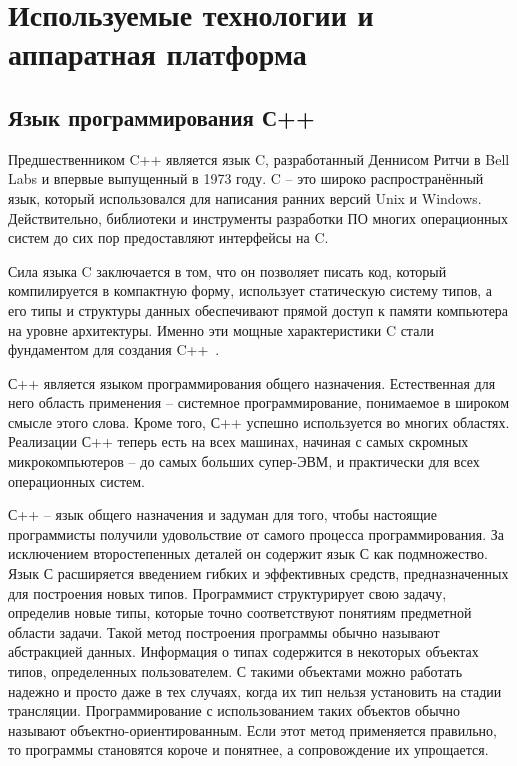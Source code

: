 \section{Используемые технологии и аппаратная платформа}


\subsection{Язык программирования С++}

Предшественником C++ является язык C, разработанный Деннисом Ритчи в Bell Labs и впервые выпущенный в 1973 году. C -- это широко распространённый язык, который использовался для написания ранних версий Unix и Windows. Действительно, библиотеки и инструменты разработки ПО многих операционных систем до сих пор предоставляют интерфейсы на C.

Сила языка C заключается в том, что он позволяет писать код, который компилируется в компактную форму, использует статическую систему типов, а его типы и структуры данных обеспечивают прямой доступ к памяти компьютера на уровне архитектуры. Именно эти мощные характеристики C стали фундаментом для создания C++~\cite{Cpp}.

С++ является языком программирования общего назначения. Естественная для него область
применения -- системное программирование, понимаемое в широком смысле этого слова. Кроме того, С++ успешно используется во многих областях. Реализации С++ теперь есть на всех машинах, начиная с самых скромных микрокомпьютеров -- до самых больших супер-ЭВМ, и практически для всех операционных систем.

С++ -- язык общего назначения и задуман для того, чтобы настоящие программисты получили
удовольствие от самого процесса программирования. За исключением второстепенных деталей он содержит язык С как подмножество. Язык С расширяется введением гибких и эффективных средств, предназначенных для построения новых типов. Программист структурирует свою задачу, определив новые типы, которые точно соответствуют понятиям предметной области задачи. Такой метод построения программы обычно называют абстракцией данных. Информация о типах содержится в некоторых объектах типов, определенных пользователем. С такими объектами можно работать надежно и просто даже в тех случаях, когда их тип нельзя установить на стадии трансляции. Программирование с использованием таких объектов обычно называют объектно-ориентированным. Если этот метод применяется правильно, то программы становятся короче и понятнее, а сопровождение их упрощается.

